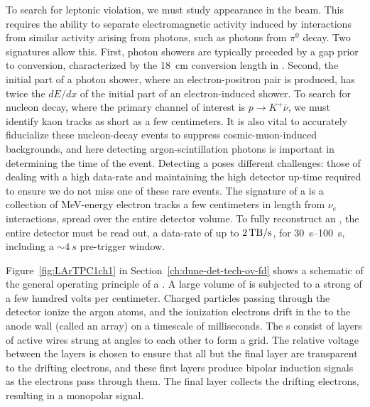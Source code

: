 To search for leptonic  violation, we must study \nue appearance in the  \numu beam. This requires the ability to separate electromagnetic activity induced by  \nue interactions from similar activity arising from photons, such as photons from $\pi^{0}$ decay. Two signatures allow this. First, photon showers are typically preceded by a gap prior to conversion, characterized by the \SI{18}{cm} conversion length in . Second, the initial part of a photon shower, where an electron-positron pair is produced, has twice the $dE/dx$ of the initial part of an electron-induced shower. To search for nucleon decay, where the primary channel of interest is $p\rightarrow K^{+}\overline{\nu}$, we must identify kaon tracks as short as a few centimeters. It is also vital to accurately fiducialize these nucleon-decay events to suppress cosmic-muon-induced backgrounds, and here detecting argon-scintillation photons is important in determining the time of the event. Detecting a  poses different challenges: those of dealing with a high data-rate and maintaining the high detector up-time required to ensure we do not miss one of these rare events. The signature of a  is a collection of MeV-energy electron tracks a few centimeters in length from  $\nu_{e}$ interactions, spread over the entire detector volume. To fully reconstruct an , the entire detector must be read out, a data-rate of up to $\SI{2}{\tera\byte/\second}$, for \SIrange{30}{100}{s}, including a $\sim\!\SI{4}{s}$ pre-trigger window.



Figure~\ref{fig:LArTPC1ch1} in Section~\ref{ch:dune-det-tech-ov-fd} shows a schematic of the general operating principle of a  . A large volume of  is subjected to a strong \efield of a few hundred volts per centimeter. Charged particles passing through the detector ionize the argon atoms, and the ionization electrons drift in the \efield to the anode wall (called an  array) on a timescale of milliseconds. 
The  s consist of layers of active wires strung at angles to each other to form a grid. The relative voltage between the layers is chosen to ensure that all but the final layer are transparent to the drifting electrons, and these first layers produce bipolar induction signals as the electrons pass through them. The final layer collects the drifting electrons, resulting in a monopolar signal.


